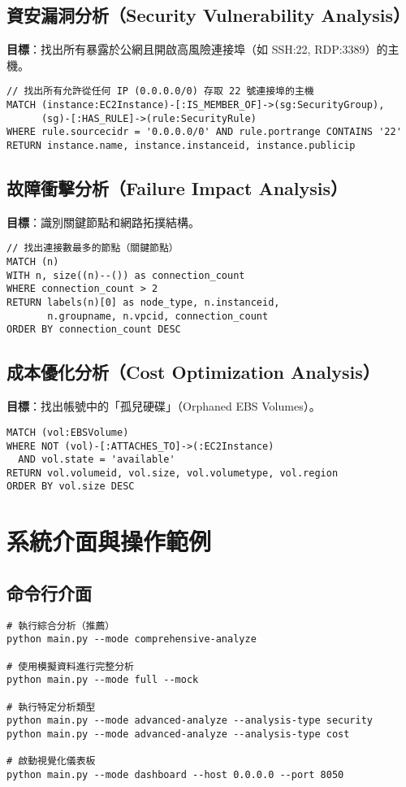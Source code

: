 \documentclass[11pt,a4paper]{ctexart}
\begin{document}
\subsection{資安漏洞分析（Security Vulnerability Analysis）}
\textbf{目標}：找出所有暴露於公網且開啟高風險連接埠（如 SSH:22, RDP:3389）的主機。

\begin{lstlisting}[language=Cypher,caption={尋找允許 0.0.0.0/0 存取 22 埠之主機}]
// 找出所有允許從任何 IP (0.0.0.0/0) 存取 22 號連接埠的主機
MATCH (instance:EC2Instance)-[:IS_MEMBER_OF]->(sg:SecurityGroup),
      (sg)-[:HAS_RULE]->(rule:SecurityRule)
WHERE rule.sourcecidr = '0.0.0.0/0' AND rule.portrange CONTAINS '22'
RETURN instance.name, instance.instanceid, instance.publicip
\end{lstlisting}

\subsection{故障衝擊分析（Failure Impact Analysis）}
\textbf{目標}：識別關鍵節點和網路拓撲結構。

\begin{lstlisting}[language=Cypher,caption={關鍵節點識別}]
// 找出連接數最多的節點（關鍵節點）
MATCH (n)
WITH n, size((n)--()) as connection_count
WHERE connection_count > 2
RETURN labels(n)[0] as node_type, n.instanceid, 
       n.groupname, n.vpcid, connection_count
ORDER BY connection_count DESC
\end{lstlisting}

\subsection{成本優化分析（Cost Optimization Analysis）}
\textbf{目標}：找出帳號中的「孤兒硬碟」（Orphaned EBS Volumes）。

\begin{lstlisting}[language=Cypher,caption={找出未連接至任何 EC2 的 EBS 磁碟}]
MATCH (vol:EBSVolume)
WHERE NOT (vol)-[:ATTACHES_TO]->(:EC2Instance)
  AND vol.state = 'available'
RETURN vol.volumeid, vol.size, vol.volumetype, vol.region
ORDER BY vol.size DESC
\end{lstlisting}

\section{系統介面與操作範例}
\subsection{命令行介面}
\begin{verbatim}
# 執行綜合分析（推薦）
python main.py --mode comprehensive-analyze

# 使用模擬資料進行完整分析
python main.py --mode full --mock

# 執行特定分析類型
python main.py --mode advanced-analyze --analysis-type security
python main.py --mode advanced-analyze --analysis-type cost

# 啟動視覺化儀表板
python main.py --mode dashboard --host 0.0.0.0 --port 8050
\end{verbatim}
\end{document}
